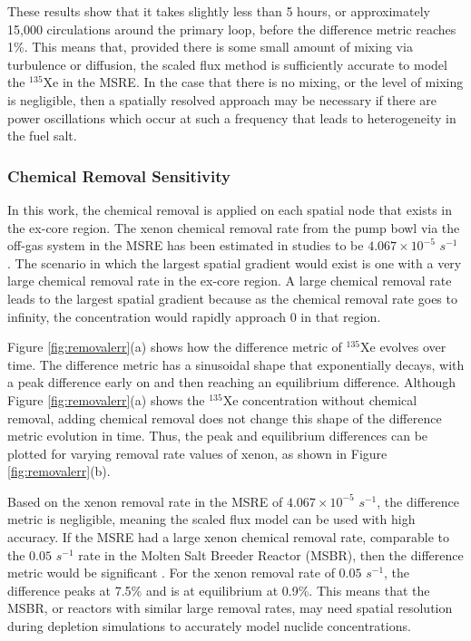 \documentclass{style/nseJournal}
\begin{document}
These results show that it takes slightly less than 5 hours, or approximately 15,000 circulations around the primary loop, before the difference metric reaches 1\%.
This means that, provided there is some small amount of mixing via turbulence or diffusion, the scaled flux method is sufficiently accurate to model the $^{135}$Xe in the MSRE.
In the case that there is no mixing, or the level of mixing is negligible, then a spatially resolved approach may be necessary if there are power oscillations which occur at such a frequency that leads to heterogeneity in the fuel salt.
\FloatBarrier

\subsubsection{Chemical Removal Sensitivity}

In this work, the chemical removal is applied on each spatial node that exists in the ex-core region.
The xenon chemical removal rate from the pump bowl via the off-gas system in the MSRE has been estimated in studies to be $4.067 \times 10^{-5}$ $s^{-1}$ \cite{lo2022application}.
The scenario in which the largest spatial gradient would exist is one with a very large chemical removal rate in the ex-core region.
A large chemical removal rate leads to the largest spatial gradient because as the chemical removal rate goes to infinity, the concentration would rapidly approach 0 in that region.

Figure \ref{fig:removalerr}(a) shows how the difference metric of $^{135}$Xe evolves over time.
The difference metric has a sinusoidal shape that exponentially decays, with a peak difference early on and then reaching an equilibrium difference.
Although Figure \ref{fig:removalerr}(a) shows the $^{135}$Xe concentration without chemical removal, adding chemical removal does not change this shape of the difference metric evolution in time.
Thus, the peak and equilibrium differences can be plotted for varying removal rate values of xenon, as shown in Figure \ref{fig:removalerr}(b).

Based on the xenon removal rate in the MSRE of $4.067 \times 10^{-5}$ $s^{-1}$, the difference metric is negligible, meaning the scaled flux model can be used with high accuracy.
If the MSRE had a large xenon chemical removal rate, comparable to the $0.05$ $s^{-1}$ rate in the Molten Salt Breeder Reactor (MSBR), then the difference metric would be significant \cite{robertson1971conceptual}.
For the xenon removal rate of $0.05$ $s^{-1}$, the difference peaks at 7.5\% and is at equilibrium at 0.9\%.
This means that the MSBR, or reactors with similar large removal rates, may need spatial resolution during depletion simulations to accurately model nuclide concentrations.
\end{document}
